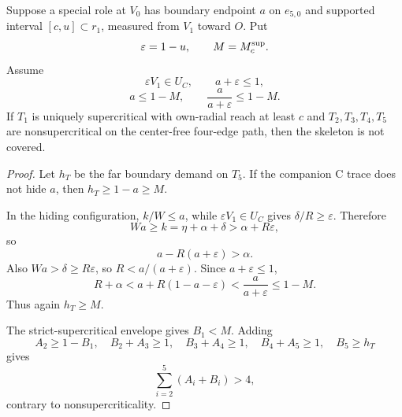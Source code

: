 \begin{lemma}
\label{lem:new-rescuer-tail-budget}
Suppose a special role at $V_0$ has boundary endpoint $a$ on $e_{5,0}$ and
supported interval $[c,u]\subset r_1$, measured from $V_1$ toward $O$.
Put
\[
 \varepsilon=1-u,
 \qquad M=M_c^{\rm sup}.
\]
Assume
\[
 \varepsilon V_1\in U_C,
 \qquad a+\varepsilon\le1,
\]
\begin{equation}
 a\le1-M,
 \qquad
 \frac{a}{a+\varepsilon}\le1-M.
 \label{eq:rescuer-tail-hypotheses}
\end{equation}
If $T_1$ is uniquely supercritical with own-radial reach at least $c$ and
$T_2,T_3,T_4,T_5$ are nonsupercritical on the center-free four-edge path,
then the skeleton is not covered.
\end{lemma}

\begin{proof}
Let $h_T$ be the far boundary demand on $T_5$.  If the companion C trace
does not hide $a$, then $h_T\ge1-a\ge M$.

In the hiding configuration, $k/W\le a$, while
$\varepsilon V_1\in U_C$ gives $\delta/R\ge\varepsilon$.  Therefore
\[
 Wa\ge k=\eta+\alpha+\delta>\alpha+R\varepsilon,
\]
so
\[
 a-R(a+\varepsilon)>\alpha.
\]
Also $Wa>\delta\ge R\varepsilon$, so
$R<a/(a+\varepsilon)$.  Since $a+\varepsilon\le1$,
\[
 R+\alpha
 <a+R(1-a-\varepsilon)
 <\frac{a}{a+\varepsilon}
 \le1-M.
\]
Thus again $h_T\ge M$.

The strict-supercritical envelope gives $B_1<M$.  Adding
\[
 A_2\ge1-B_1,
 \quad B_2+A_3\ge1,
 \quad B_3+A_4\ge1,
 \quad B_4+A_5\ge1,
 \quad B_5\ge h_T
\]
gives
\[
 \sum_{i=2}^5(A_i+B_i)>4,
\]
contrary to nonsupercriticality.
\end{proof}